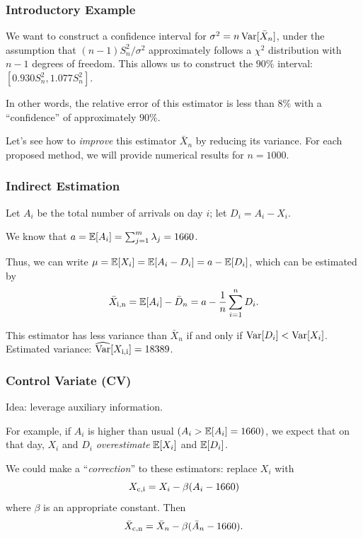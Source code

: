 \documentclass[t,usepdftitle=false,aspectratio=169]{beamer}
\begin{document}
\begin{frame}
	\frametitle{Introductory Example}
	
	We want to construct a confidence interval for \(\sigma^2 = n \operatorname{Var}[\bar X_n]\), under the assumption that \((n-1)S_n^2/\sigma^2\) approximately follows a \(\chi^2\) distribution with \(n-1\) degrees of freedom. This allows us to construct the \(90\%\) interval: \([0.930S_n^2, 1.077S_n^2]\).
	
	\mbox{}
	
	In other words, the relative error of this estimator is less than \(8\%\) with a ``confidence'' of approximately \(90\%\).
	
	\mbox{}
	
	Let's see how to \emph{improve} this estimator \(\bar X_n\) by reducing its variance. For each proposed method, we will provide numerical results for \(n = 1000\).
	
\end{frame}

\begin{frame}
	\frametitle{Indirect Estimation}
	
	Let \(A_i\) be the total number of arrivals on day \(i\); let \(D_i = A_i - X_i\).
	
	\mbox{}
	
	We know that \(a = {\mathbb{E}}[A_i] = \sum_{j=1}^m \lambda_j = 1660\).
	
	\mbox{}
	
	Thus, we can write \(\mu = {\mathbb{E}}[X_i] = {\mathbb{E}}[A_i - D_i] = a - {\mathbb{E}}[D_i]\), which 
	can be estimated by
	$$ {\bar X_{\rm{i},n}} = {\mathbb{E}}[A_i] - \bar D_n = a - {1\over n} \sum_{i=1}^n D_i.$$
	
	\mbox{}
	
	This estimator has less variance than \(\bar X_n\) if and only if \(\operatorname{Var}[D_i] < \operatorname{Var}[X_i]\). 
	Estimated variance: \(\widehat{\operatorname{Var}}[X_{\rm{i},i}] = {18389}\).
	
\end{frame}

\begin{frame}
	\frametitle{Control Variate (CV)}
	
	Idea: leverage auxiliary information.
	
	\mbox{}
	
	For example, if \(A_i\) is higher than usual \((A_i > {\mathbb{E}}[A_i] = 1660)\),
	we expect that on that day, \(X_i\) and \(D_i\) 
	\emph{overestimate} \({\mathbb{E}}[X_i]\) and \({\mathbb{E}}[D_i]\).
	
	\mbox{}
	
	We could make a ``\emph{correction}'' to these estimators:
	replace \(X_i\) with
	$$ X_{\rm{c},i} = X_i - {\beta} (A_i - 1660) $$
	where \(\beta\) is an appropriate constant. Then
	\[
	{\bar X_{\rm{c},n}} = \bar X_n - \beta (\bar A_n - 1660).
	\]
	
\end{frame}
\end{document}
